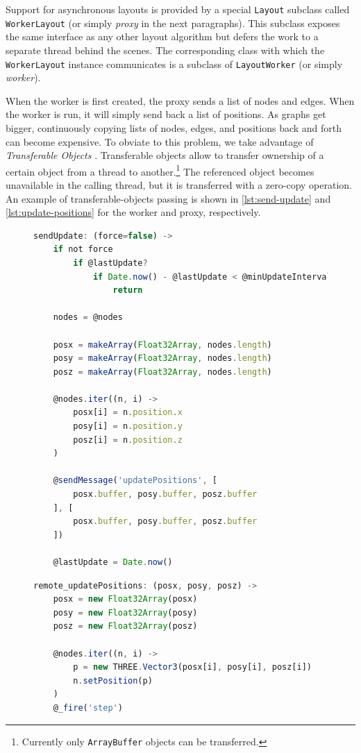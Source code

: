 Support for asynchronous layouts is provided by a special \texttt{Layout} subclass called \texttt{Worker\BreakableSlash{}Layout} (or simply \emph{proxy} in the next paragraphs). This subclass exposes the same interface as any other layout algorithm but defers the work to a separate thread behind the scenes. The corresponding class with which the \texttt{WorkerLayout} instance communicates is a subclass of \texttt{LayoutWorker} (or simply \emph{worker}).

When the worker is first created, the proxy sends a list of nodes and edges. When the worker is run, it will simply send back a list of positions. As graphs get bigger, continuously copying lists of nodes, edges, and positions back and forth can become expensive. To obviate to this problem, we take advantage of \emph{Transferable Objects} \cite{webworker}. Transferable objects allow to transfer ownership of a certain object from a thread to another.\footnote{Currently only \texttt{ArrayBuffer} objects can be transferred.} The referenced object becomes unavailable in the calling thread, but it is transferred with a zero-copy operation. An example of transferable-objects passing is shown in \vref{lst:send-update} and \vref{lst:update-positions} for the worker and proxy, respectively.

\begin{figure}
\begin{lstlisting}[caption={Method used to send position updates from the worker to the proxy.},label=lst:send-update,language=javascript]
sendUpdate: (force=false) ->
    if not force
        if @lastUpdate?
            if Date.now() - @lastUpdate < @minUpdateInterval
                return

    nodes = @nodes

    posx = makeArray(Float32Array, nodes.length)
    posy = makeArray(Float32Array, nodes.length)
    posz = makeArray(Float32Array, nodes.length)

    @nodes.iter((n, i) ->
        posx[i] = n.position.x
        posy[i] = n.position.y
        posz[i] = n.position.z
    )

    @sendMessage('updatePositions', [
        posx.buffer, posy.buffer, posz.buffer
    ], [
        posx.buffer, posy.buffer, posz.buffer
    ])

    @lastUpdate = Date.now()
\end{lstlisting}
\end{figure}

\begin{figure}
\begin{lstlisting}[caption={Method handling the position update messages on the proxy.},label=lst:update-positions,language=javascript]
remote_updatePositions: (posx, posy, posz) ->
    posx = new Float32Array(posx)
    posy = new Float32Array(posy)
    posz = new Float32Array(posz)

    @nodes.iter((n, i) ->
        p = new THREE.Vector3(posx[i], posy[i], posz[i])
        n.setPosition(p)
    )
    @_fire('step')
\end{lstlisting}
\end{figure}


